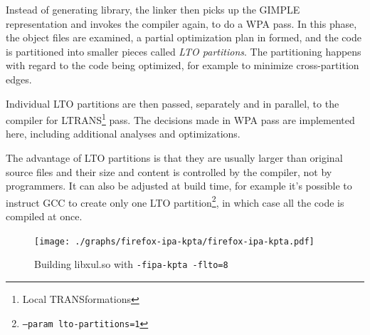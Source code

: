 Instead of generating library, the linker then picks up the GIMPLE
representation and invokes the compiler again, to do a WPA pass. In this phase,
the object files are examined, a partial optimization plan in formed, and the
code is partitioned into smaller pieces called {\sl LTO partitions}. The
partitioning happens with regard to the code being optimized, for example to
minimize cross-partition edges.

Individual LTO partitions are then passed, separately and in parallel, to the
compiler for LTRANS\footnote{Local TRANSformations} pass. The decisions made in
WPA pass are implemented here, including additional analyses and optimizations.

The advantage of LTO partitions is that they are usually larger than original
source files and their size and content is controlled by the compiler, not by
programmers. It can also be adjusted at build time, for example it's possible
to instruct GCC to create only one LTO partition\footnote{\tt --param
lto-partitions=1}, in which case all the code is
compiled at once.


\begin{figure}[h!]
	\label{figure-firefox-ipa-kpta}
	\centering
	\texttt{[image: ./graphs/firefox-ipa-kpta/firefox-ipa-kpta.pdf]}
	\caption{Building libxul.so with {\tt -fipa-kpta -flto=8}}
\end{figure}
